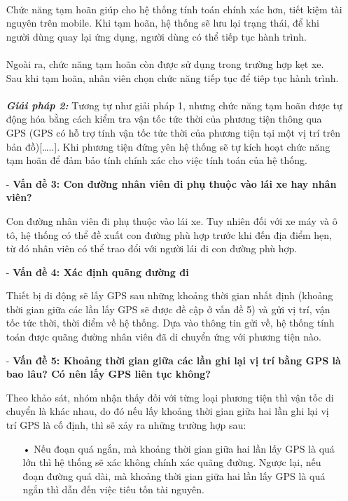 \documentclass[a4paper]{article}
\begin{document}
\begin{itemize}
    \\
    Chức năng tạm hoãn giúp cho hệ thống tính toán chính xác hơn, tiết kiệm tài nguyên trên mobile. Khi tạm hoãn, hệ thống sẽ lưu lại trạng thái, để khi người dùng quay lại ứng dụng, người dùng có thể tiếp tục hành trình.\\
    \\
    Ngoài ra, chức năng tạm hoãn còn được sử dụng trong trường hợp kẹt xe. Sau khi tạm hoãn, nhân viên chọn chức năng tiếp tục để tiêp tục hành trình.\\
    \\
    \textit{\textbf{Giải pháp 2:}} Tương tự như giải pháp 1, nhưng chức năng tạm hoãn được tự động hóa bằng cách kiểm tra vận tốc tức thời của phương tiện thông qua GPS (GPS có hỗ trợ tính vận tốc tức thời của phương tiện tại một vị trí trên bản đồ)[…..]. Khi phương tiện đứng yên hệ thống sẽ tự kích hoạt chức năng tạm hoãn để đảm bảo tính chính xác cho việc tính toán của hệ thống. 
    \item[-] \textbf{Vấn đề 3: Con đường nhân viên đi phụ thuộc vào lái xe hay nhân viên?}\par
    Con đường nhân viên đi phụ thuộc vào lái xe. Tuy nhiên đối với xe máy và ô tô, hệ thống có thể đề xuất con đường phù hợp trước khi đến địa điểm hẹn, từ đó nhân viên có thể trao đổi với người lái đi con đường phù hợp. 
    \item[-] \textbf{Vấn đề 4: Xác định quãng đường đi}\par
    Thiết bị di động sẽ lấy GPS sau những khoảng thời gian nhất định (khoảng thời gian giữa các lần lấy GPS sẽ được đề cập ở vấn đề 5) và gửi vị trí, vận tốc tức thời, thời điểm về hệ thống. Dựa vào thông tin gửi về, hệ thống tính toán được quãng đường nhân viên đã di chuyển ứng với phương tiện nào.
    \item[-] \textbf{Vấn đề 5: Khoảng thời gian giữa các lần ghi lại vị trí bằng GPS là bao lâu? Có nên lấy GPS liên tục không?}\par
    Theo khảo sát, nhóm nhận thấy đối với từng loại phương tiện thì vận tốc di chuyển là khác nhau, do đó nếu lấy khoảng thời gian giữa hai lần ghi lại vị trí GPS là cố định, thì sẽ xảy ra những trường hợp sau:
    \begin{itemize}  
        \item[•] Nếu đoạn quá ngắn, mà khoảng thời gian giữa hai lần lấy GPS là quá lớn thì hệ thống sẽ xác  không chính xác quãng đường. Ngược lại, nếu đoạn đường quá dài, mà khoảng thời gian  giữa hai lần lấy GPS là quá ngắn thì dẫn đến việc tiêu tốn tài nguyên.

\end{itemize}
\end{itemize}
\end{document}
